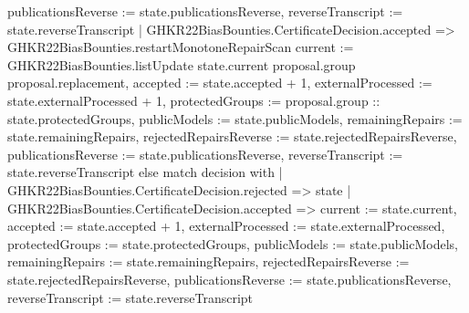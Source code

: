 \documentclass[10pt]{article}
\begin{document}
\begin{ReviewVerbatim}
{          publicationsReverse := state.publicationsReverse, reverseTranscript := state.reverseTranscript }
      | GHKR22BiasBounties.CertificateDecision.accepted =>
        GHKR22BiasBounties.restartMonotoneRepairScan
          { current := GHKR22BiasBounties.listUpdate state.current proposal.group proposal.replacement,
            accepted := state.accepted + 1, externalProcessed := state.externalProcessed + 1,
            protectedGroups := proposal.group :: state.protectedGroups, publicModels := state.publicModels,
            remainingRepairs := state.remainingRepairs, rejectedRepairsReverse := state.rejectedRepairsReverse,
            publicationsReverse := state.publicationsReverse, reverseTranscript := state.reverseTranscript }
    else
      match decision with
      | GHKR22BiasBounties.CertificateDecision.rejected => state
      | GHKR22BiasBounties.CertificateDecision.accepted =>
        { current := state.current, accepted := state.accepted + 1, externalProcessed := state.externalProcessed,
          protectedGroups := state.protectedGroups, publicModels := state.publicModels,
          remainingRepairs := state.remainingRepairs, rejectedRepairsReverse := state.rejectedRepairsReverse,
          publicationsReverse := state.publicationsReverse, reverseTranscript := state.reverseTranscript }
\end{ReviewVerbatim}
\end{document}
